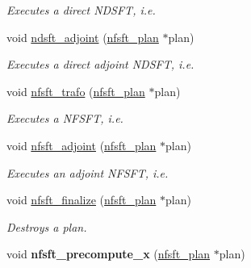 \begin{CompactItemize}
\begin{CompactList}\small\item\em Executes a direct NDSFT, i.e. \item\end{CompactList}\item 
void \hyperlink{group__nfsft_ga7}{ndsft\_\-adjoint} (\hyperlink{structnfsft__plan}{nfsft\_\-plan} $\ast$plan)
\begin{CompactList}\small\item\em Executes a direct adjoint NDSFT, i.e. \item\end{CompactList}\item 
void \hyperlink{group__nfsft_ga8}{nfsft\_\-trafo} (\hyperlink{structnfsft__plan}{nfsft\_\-plan} $\ast$plan)
\begin{CompactList}\small\item\em Executes a NFSFT, i.e. \item\end{CompactList}\item 
void \hyperlink{group__nfsft_ga9}{nfsft\_\-adjoint} (\hyperlink{structnfsft__plan}{nfsft\_\-plan} $\ast$plan)
\begin{CompactList}\small\item\em Executes an adjoint NFSFT, i.e. \item\end{CompactList}\item 
void \hyperlink{group__nfsft_ga10}{nfsft\_\-finalize} (\hyperlink{structnfsft__plan}{nfsft\_\-plan} $\ast$plan)
\begin{CompactList}\small\item\em Destroys a plan. \item\end{CompactList}\item 
\hypertarget{group__nfsft_ga11}{
void {\bf nfsft\_\-precompute\_\-x} (\hyperlink{structnfsft__plan}{nfsft\_\-plan} $\ast$plan)}
\label{group__nfsft_ga11}


\end{CompactItemize}

